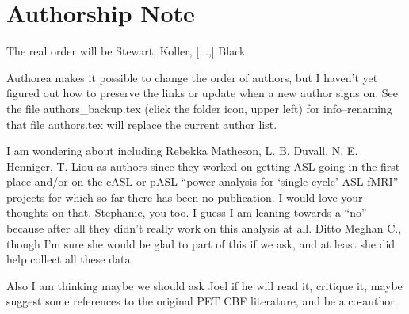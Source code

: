 \section*{Authorship Note}
The real order will be Stewart, Koller, [...,] Black.

Authorea makes it possible to change the order of authors, but I haven't yet figured out how to preserve the links or update when a new author signs on. See the file authors\_backup.tex (click the folder icon, upper left) for info--renaming that file authors.tex will replace the current author list.

I am wondering about including Rebekka Matheson, L. B. Duvall, N. E. Henniger, T. Liou as authors since they worked on getting ASL going in the first place and/or on the cASL or pASL ``power analysis for `single-cycle' ASL fMRI'' projects for which so far there has been no publication. I would love your thoughts on that. Stephanie, you too. I guess I am leaning towards a ``no'' because after all they didn't really work on this analysis at all. Ditto Meghan C., though I'm sure she would be glad to part of this if we ask, and at least she did help collect all these data. 

Also I am thinking maybe we should ask Joel if he will read it, critique it, maybe suggest some references to the original PET CBF literature, and be a co-author. 